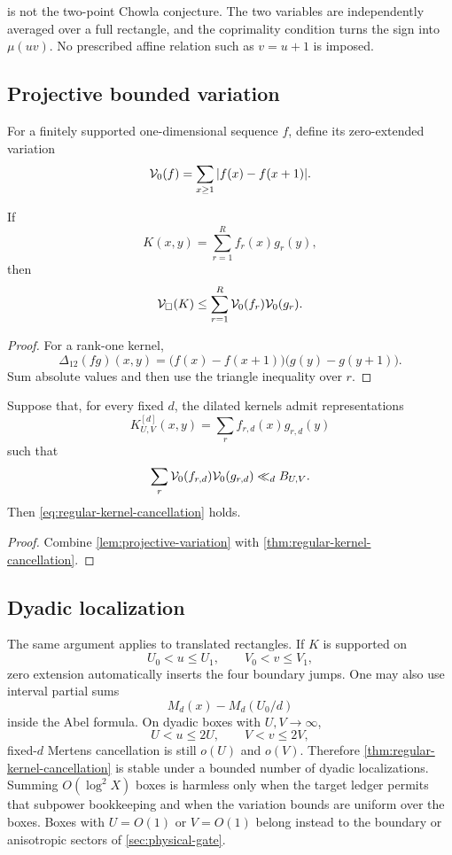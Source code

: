 \begin{remark}
 is not the two-point Chowla conjecture.
The two variables are independently averaged over a full rectangle, and
the coprimality condition turns the sign into \(\mu(uv)\).  No prescribed
affine relation such as \(v=u+1\) is imposed.
\end{remark}

\subsection{Projective bounded variation}

For a finitely supported one-dimensional sequence \(f\), define its
zero-extended variation
\[
 \mathcal V_0(f)=\sum_{x\ge1}|f(x)-f(x+1)|.
\]

\begin{lemma}
\label{lem:projective-variation}
If
\[
 K(x,y)=\sum_{r=1}^R f_r(x)g_r(y),
\]
then
\begin{equation}
 \mathcal V_\square(K)
 \le
 \sum_{r=1}^R\mathcal V_0(f_r)\mathcal V_0(g_r).
\label{eq:projective-variation}
\end{equation}
\end{lemma}

\begin{proof}
For a rank-one kernel,
\[
 \Delta_{12}(fg)(x,y)
 =
 \bigl(f(x)-f(x+1)\bigr)
 \bigl(g(y)-g(y+1)\bigr).
\]
Sum absolute values and then use the triangle inequality over \(r\).
\end{proof}

\begin{corollary}
\label{cor:projective-bv}
Suppose that, for every fixed \(d\), the dilated kernels admit
representations
\[
 K_{U,V}^{[d]}(x,y)
 =
 \sum_r f_{r,d}(x)g_{r,d}(y)
\]
such that
\[
 \sum_r\mathcal V_0(f_{r,d})\mathcal V_0(g_{r,d})
 \ll_d B_{U,V}.
\]
Then \eqref{eq:regular-kernel-cancellation} holds.
\end{corollary}

\begin{proof}
Combine \cref{lem:projective-variation} with
\cref{thm:regular-kernel-cancellation}.
\end{proof}

\subsection{Dyadic localization}

The same argument applies to translated rectangles.  If \(K\) is supported
on
\[
 U_0<u\le U_1,\qquad V_0<v\le V_1,
\]
zero extension automatically inserts the four boundary jumps.  One may
also use interval partial sums
\[
 M_d(x)-M_d(U_0/d)
\]
inside the Abel formula.  On dyadic boxes with \(U,V\to\infty\),
\[
 U<u\le2U,\qquad V<v\le2V,
\]
fixed-\(d\) Mertens cancellation is still \(o(U)\) and \(o(V)\).
Therefore \cref{thm:regular-kernel-cancellation} is stable under a bounded
number of dyadic localizations.  Summing \(O(\log^2 X)\) boxes is harmless
only when the target ledger permits that subpower bookkeeping and when the
variation bounds are uniform over the boxes.
Boxes with \(U=O(1)\) or \(V=O(1)\) belong instead to the boundary or
anisotropic sectors of \cref{sec:physical-gate}.

